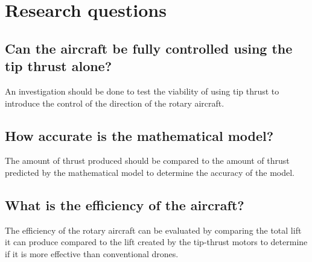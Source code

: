 \section{Research questions}
    \subsection{Can the aircraft be fully controlled using the tip thrust alone?}
        An investigation should be done to test the viability of using tip thrust to introduce the control of the direction of the rotary aircraft.
    \subsection{How accurate is the mathematical model?}
        The amount of thrust produced should be compared to the amount of thrust predicted by the mathematical model to determine the accuracy of the model.
    \subsection{What is the efficiency of the aircraft?}
        The efficiency of the rotary aircraft can be evaluated by comparing the total lift it can produce compared to the lift created by the tip-thrust motors to determine if it is more effective than conventional drones.

